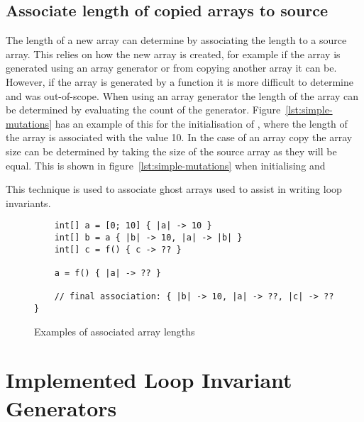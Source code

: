 
\subsection{Associate length of copied arrays to source}\label{s:copied-array}

The length of a new array can determine by associating the length to a source
array.
This relies on how the new array is created, for example if the array is
generated using an array generator or from copying another array it can be.
However, if the array is generated by a function it is more difficult to
determine and was out-of-scope.
When using an array generator the length of the array can be determined by
evaluating the count of the generator.
Figure~\ref{lst:simple-mutations} has an example of this for the initialisation
of , where the length of the array is associated with the value 10.
In the case of an array copy the array size can be determined by taking the
size of the source array as they will be equal.
This is shown in figure~\ref{lst:simple-mutations} when initialising 
and 

This technique is used to associate ghost arrays used to assist in writing
loop invariants.

\begin{figure}[ht]
	\begin{lstlisting}
	int[] a = [0; 10] { |a| -> 10 }
	int[] b = a { |b| -> 10, |a| -> |b| }
	int[] c = f() { c -> ?? }
	
	a = f() { |a| -> ?? }
	
	// final association: { |b| -> 10, |a| -> ??, |c| -> ?? }
	\end{lstlisting}
	\caption{Examples of associated array lengths}
	\label{lst:assoicated-arrays}
\end{figure}

\section{Implemented Loop Invariant Generators}

